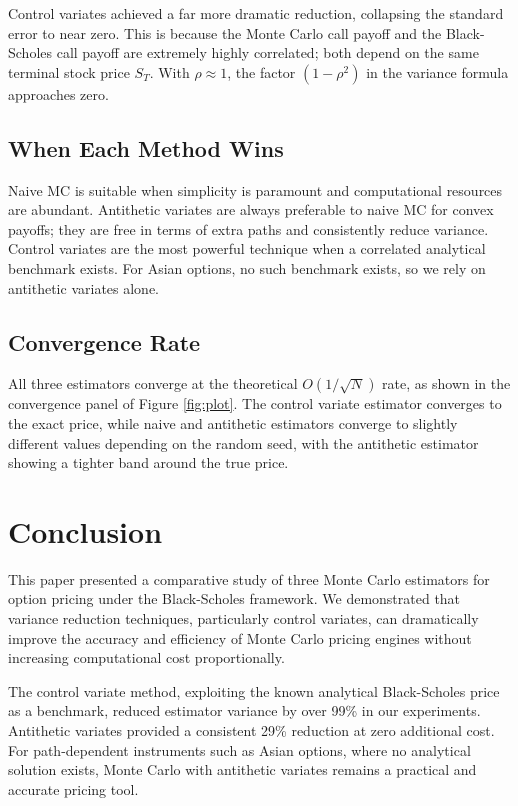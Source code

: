 \documentclass[12pt]{article}
\begin{document}
Control variates achieved a far more dramatic reduction, collapsing the
standard error to near zero. This is because the Monte Carlo call payoff
and the Black-Scholes call payoff are extremely highly correlated;
both depend on the same terminal stock price $S_T$. With $\rho \approx 1$,
the factor $(1 - \rho^2)$ in the variance formula approaches zero.

\subsection{When Each Method Wins}

Naive MC is suitable when simplicity is paramount and computational
resources are abundant. Antithetic variates are always preferable to
naive MC for convex payoffs; they are free in terms of extra paths
and consistently reduce variance. Control variates are the most powerful
technique when a correlated analytical benchmark exists. For Asian options,
no such benchmark exists, so we rely on antithetic variates alone.

\subsection{Convergence Rate}

All three estimators converge at the theoretical $O(1/\sqrt{N})$ rate,
as shown in the convergence panel of Figure \ref{fig:plot}. The control
variate estimator converges to the exact price, while naive and antithetic
estimators converge to slightly different values depending on the random
seed, with the antithetic estimator showing a tighter band around the
true price.

\section{Conclusion}

This paper presented a comparative study of three Monte Carlo estimators
for option pricing under the Black-Scholes framework. We demonstrated
that variance reduction techniques, particularly control variates,
can dramatically improve the accuracy and efficiency of Monte Carlo
pricing engines without increasing computational cost proportionally.

The control variate method, exploiting the known analytical Black-Scholes
price as a benchmark, reduced estimator variance by over 99\% in our
experiments. Antithetic variates provided a consistent 29\% reduction at
zero additional cost. For path-dependent instruments such as Asian options,
where no analytical solution exists, Monte Carlo with antithetic variates
remains a practical and accurate pricing tool.
\end{document}
